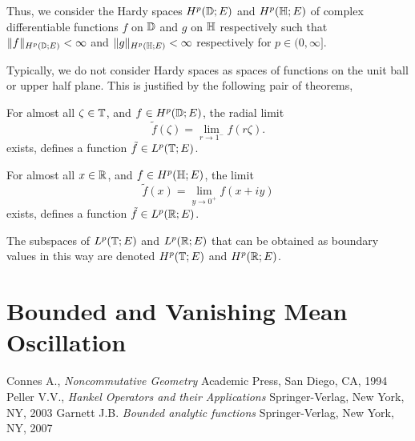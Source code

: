 \documentclass{unswmaths}
\begin{document}
Thus, we consider the Hardy spaces $H^p(\mathbb{D};E)$ and $H^p(\mathbb{H};E)$
of complex differentiable functions $f$ on $\mathbb{D}$ and $g$ on $\mathbb{H}$
respectively such that $\|f\|_{H^p(\mathbb{D};E)} < \infty$ and $\|g\|_{H^p(\mathbb{H};E)} < \infty$
respectively for $p \in (0,\infty]$. 

Typically, we do not consider Hardy spaces as spaces of functions
on the unit ball or upper half plane. This is justified
by the following pair of theorems,
\begin{theorem}
    For almost all $\zeta \in \mathbb{T}$, and $f \in H^p(\mathbb{D};E)$, the radial limit
    \begin{equation*}
        \tilde{f}(\zeta) = \lim_{r\rightarrow1^{-}}f(r\zeta).
    \end{equation*}
    exists, defines a function $\tilde{f} \in L^p(\mathbb{T};E)$.
\end{theorem}
\begin{theorem}
    For almost all $x \in \mathbb{R}$, and $f \in H^p(\mathbb{H};E)$, the limit
    \begin{equation*}
        \tilde{f}(x) = \lim_{y\rightarrow 0^{+}} f(x+iy)
    \end{equation*}
    exists, defines a function $\tilde{f} \in L^p(\mathbb{R};E)$.
\end{theorem}

The subspaces of $L^p(\mathbb{T};E)$ and $L^p(\mathbb{R};E)$ that can be obtained
as boundary values in this way are denoted $H^p(\mathbb{T};E)$ and $H^p(\mathbb{R};E)$.


\section*{Bounded and Vanishing Mean Oscillation}
\label{BMOandVMO}

\begin{thebibliography}{9}
     Connes A., 
    \emph{Noncommutative Geometry}
     Academic Press, 
     San Diego, 
     CA, 
     1994
    Peller V.V.,
    \emph{Hankel Operators and their Applications}
    Springer-Verlag,
    New York, 
    NY,
    2003    
    Garnett J.B.
    \emph{Bounded analytic functions}
    Springer-Verlag,
    New York,
    NY,
    2007    
\end{thebibliography}
\end{document}
